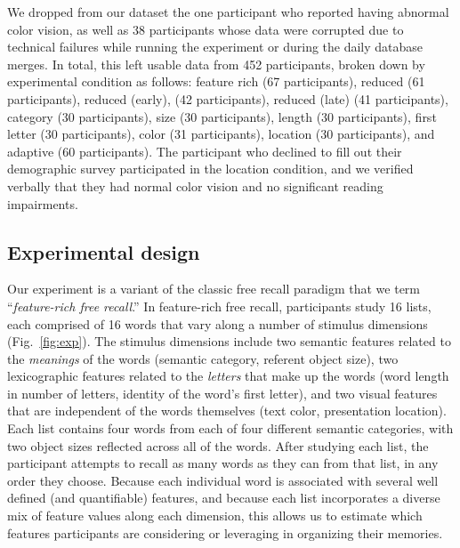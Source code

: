 \documentclass[11pt]{article}
\begin{document}
We dropped from our dataset the one participant who reported having abnormal
color vision, as well as 38 participants whose data were corrupted due to
technical failures while running the experiment or during the daily database
merges. In total, this left usable data from 452 participants, broken down by
experimental condition as follows: feature rich (67 participants), reduced (61
participants), reduced (early), (42 participants), reduced (late) (41
participants), category (30 participants), size (30 participants), length (30
participants), first letter (30 participants), color (31 participants),
location (30 participants), and adaptive (60 participants). The participant who
declined to fill out their demographic survey participated in the location
condition, and we verified verbally that they had normal color vision and no
significant reading impairments.




\subsection*{Experimental design}

Our experiment is a variant of the classic free recall paradigm that we term
``\textit{feature-rich free recall}.'' In feature-rich free recall,
participants study 16 lists, each comprised of 16 words that vary along a
number of stimulus dimensions (Fig.~\ref{fig:exp}). The stimulus dimensions
include two semantic features related to the \textit{meanings} of the words
(semantic category, referent object size), two lexicographic features related
to the \textit{letters} that make up the words (word length in number of
letters, identity of the word's first letter), and two visual features that are
independent of the words themselves (text color, presentation location). Each
list contains four words from each of four different semantic categories, with
two object sizes reflected across all of the words. After studying each list,
the participant attempts to recall as many words as they can from that list, in
any order they choose. Because each individual word is associated with several
well defined (and quantifiable) features, and because each list incorporates a
diverse mix of feature values along each dimension, this allows us to estimate
which features participants are considering or leveraging in organizing their
memories.
\end{document}
